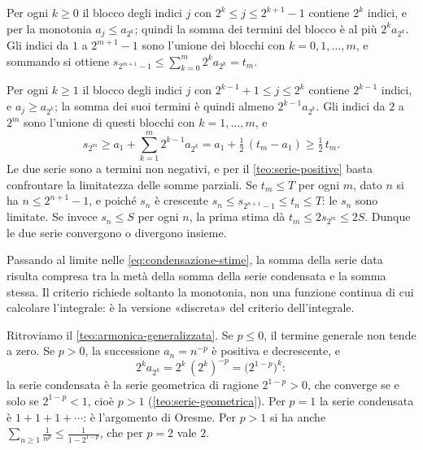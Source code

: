 \begin{dimostrazione}
Per ogni $k\ge0$ il blocco degli indici $j$ con $2^{k}\le j\le2^{k+1}-1$ contiene $2^{k}$ indici,
e per la monotonia $a_{j}\le a_{2^{k}}$; quindi la somma dei termini del blocco è al più
$2^{k}a_{2^{k}}$. Gli indici da $1$ a $2^{m+1}-1$ sono l'unione dei blocchi con $k=0,1,\dots,m$, e
sommando si ottiene $s_{2^{m+1}-1}\le\sum_{k=0}^{m}2^{k}a_{2^{k}}=t_{m}$.

Per ogni $k\ge1$ il blocco degli indici $j$ con $2^{k-1}+1\le j\le2^{k}$ contiene $2^{k-1}$ indici, e
$a_{j}\ge a_{2^{k}}$; la somma dei suoi termini è quindi almeno $2^{k-1}a_{2^{k}}$. Gli indici da $2$
a $2^{m}$ sono l'unione di questi blocchi con $k=1,\dots,m$, e
\[
  s_{2^{m}}\ge a_{1}+\sum_{k=1}^{m}2^{k-1}a_{2^{k}}=a_{1}+\tfrac12\,(t_{m}-a_{1})\ge\tfrac12\,t_{m} .
\]
Le due serie sono a termini non negativi, e per il \cref{teo:serie-positive} basta
confrontare la limitatezza delle somme parziali. Se $t_{m}\le T$ per ogni $m$, dato $n$ si
ha $n\le2^{n+1}-1$, e poiché $s_{n}$ è crescente $s_{n}\le s_{2^{n+1}-1}\le t_{n}\le T$: le $s_{n}$ sono limitate.
Se invece $s_{n}\le S$ per ogni $n$, la prima stima dà $t_{m}\le2s_{2^{m}}\le2S$. Dunque le due
serie convergono o divergono insieme.
\end{dimostrazione}

Passando al limite nelle \eqref{eq:condensazione-stime}, la somma della serie data risulta
compresa tra la metà della somma della serie condensata e la somma stessa. Il criterio
richiede soltanto la monotonia, non una funzione continua di cui calcolare l'integrale:
è la versione «discreta» del criterio dell'integrale.

\begin{esempio}\label{es:condensazione-armonica}
Ritroviamo il \cref{teo:armonica-generalizzata}. Se $p\le0$, il termine generale non
tende a zero. Se $p>0$, la successione $a_{n}=n^{-p}$ è positiva e decrescente, e
\[
  2^{k}a_{2^{k}}=2^{k}\,(2^{k})^{-p}=\bigl(2^{1-p}\bigr)^{k} :
\]
la serie condensata è la serie geometrica di ragione $2^{1-p}>0$, che converge se e solo
se $2^{1-p}<1$, cioè $p>1$ (\cref{teo:serie-geometrica}). Per $p=1$ la serie condensata
è $1+1+1+\cdots$: è l'argomento di Oresme. Per $p>1$ si ha anche
$\sum_{n\ge1}\frac1{n^{p}}\le\frac1{1-2^{1-p}}$, che per $p=2$ vale $2$.
\end{esempio}

